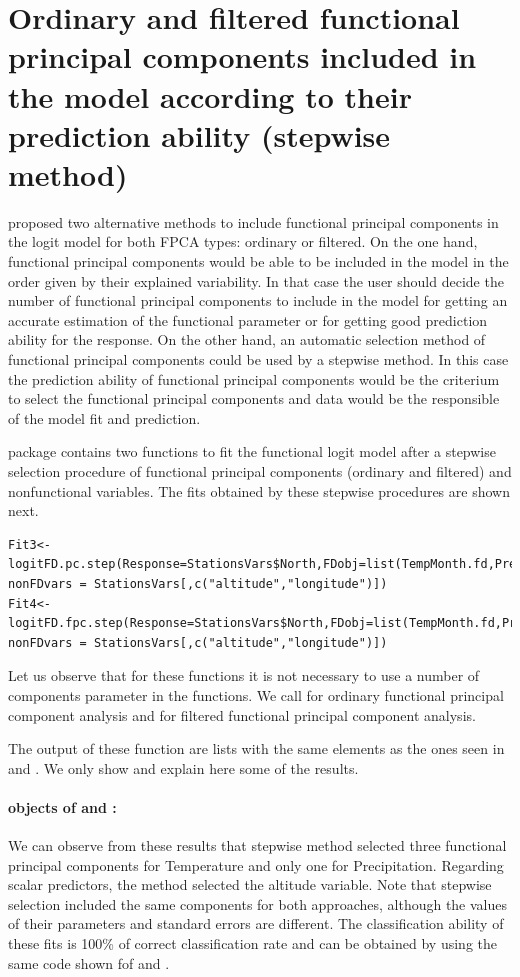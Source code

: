 \section{Ordinary and filtered functional principal components included in the model according to their prediction ability (stepwise method)}

\cite{Escabias04} proposed two alternative methods to include functional principal components in the logit model for both FPCA types: ordinary or filtered. On the one hand, functional principal components would be able to be included in the model in the order given by their explained variability. In that case the user should decide the number of functional principal components to include in the model for getting an accurate estimation of the functional parameter or for getting good prediction ability for the response. On the other hand, an automatic selection method of functional principal components could be used by a stepwise method. In this case the prediction ability of functional principal components would be the criterium to select the functional principal components and data would be the responsible of the model fit and prediction.

 package contains two functions to fit the functional logit model after a stepwise selection procedure of functional principal components (ordinary and filtered) and nonfunctional variables. The fits obtained by these stepwise procedures are shown next. 

\begin{verbatim}
Fit3<-logitFD.pc.step(Response=StationsVars$North,FDobj=list(TempMonth.fd,PrecMonth.fd),
nonFDvars = StationsVars[,c("altitude","longitude")])
Fit4<-logitFD.fpc.step(Response=StationsVars$North,FDobj=list(TempMonth.fd,PrecMonth.fd),
nonFDvars = StationsVars[,c("altitude","longitude")])
\end{verbatim}

Let us observe that for these functions it is not necessary to use a number of components parameter in the functions. We call  for ordinary functional principal component analysis and  for filtered functional principal component analysis. 

The output of these function are  lists with the same elements as the ones seen in  and . We only show and explain here some of the results.

\paragraph{ objects of  and :} We can observe from these results that stepwise method selected three functional principal components for Temperature and only one for Precipitation. Regarding scalar predictors, the method selected the altitude variable. Note that stepwise selection included the same components for both approaches, although the values of their parameters and standard errors are different. The classification ability of these fits is 100\% of correct classification rate and can be obtained by using the same code shown fof  and .

